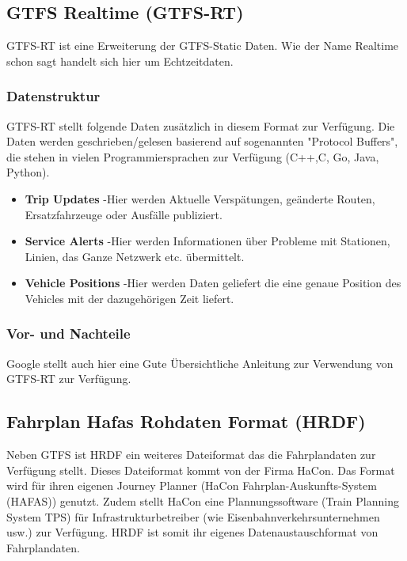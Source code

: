 \subsection{GTFS Realtime (GTFS-RT)}
\label{sec:gtfs-rt}
GTFS-RT ist eine Erweiterung der GTFS-Static Daten. Wie der Name Realtime schon sagt handelt sich hier um Echtzeitdaten. 
\subsubsection{Datenstruktur}
\label{sec:gtfs-rt-datenstruktur}
GTFS-RT stellt folgende Daten zusätzlich in diesem Format zur Verfügung. Die Daten werden geschrieben/gelesen basierend auf sogenannten "Protocol Buffers", die stehen in vielen Programmiersprachen zur Verfügung (C++,C, Go, Java, Python).\cite{gtfs-rt}
\begin{itemize}
	\item{\textbf{Trip Updates}} -Hier werden Aktuelle Verspätungen, geänderte Routen, Ersatzfahrzeuge oder Ausfälle publiziert.  
	\item{\textbf{Service Alerts}} -Hier werden Informationen über Probleme mit Stationen,  Linien, das Ganze Netzwerk etc. übermittelt. 
	\item{\textbf{Vehicle Positions}} -Hier werden Daten geliefert die eine genaue Position des Vehicles mit der dazugehörigen Zeit liefert.\cite{gtfs-rt-google} 
\end{itemize}


\subsubsection{Vor- und Nachteile}
\label{sec:gtfs-rt-vornachteile}
Google stellt auch hier eine Gute Übersichtliche Anleitung zur Verwendung von GTFS-RT zur Verfügung.

\subsection{Fahrplan Hafas Rohdaten Format (HRDF)}
\label{subsec:hrdf}
Neben GTFS ist HRDF ein weiteres Dateiformat das die Fahrplandaten zur Verfügung stellt. 
Dieses Dateiformat kommt von der Firma HaCon. Das Format wird für ihren eigenen Journey Planner (HaCon Fahrplan-Auskunfts-System (HAFAS)) genutzt. Zudem stellt HaCon eine Plannungssoftware (Train Planning System TPS) für Infrastrukturbetreiber (wie Eisenbahnverkehrsunternehmen usw.) zur Verfügung. HRDF ist somit ihr eigenes Datenaustauschformat von Fahrplandaten.\cite{haconUebersicht}


